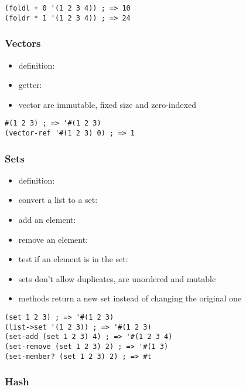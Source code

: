 \documentclass[a4paper,landscape,10pt]{article}
\begin{document}
\begin{multicols*}{2}
  \begin{lstlisting}[language=Racket]
(foldl + 0 '(1 2 3 4)) ; => 10
(foldr * 1 '(1 2 3 4)) ; => 24
  \end{lstlisting}

  \subsubsection{Vectors}

  \begin{itemize}
    \item definition: 
    \item getter: 
    \item vector are immutable, fixed size and zero-indexed
  \end{itemize}

  \begin{lstlisting}[language=Racket]
#(1 2 3) ; => '#(1 2 3)
(vector-ref '#(1 2 3) 0) ; => 1
  \end{lstlisting}

  \subsubsection{Sets}

  \begin{itemize}
    \item definition: 
    \item convert a list to a set: 
    \item add an element: 
    \item remove an element: 
    \item test if an element is in the set: 
    \item sets don't allow duplicates, are unordered and mutable
    \item methods return a new set instead of changing the original one
  \end{itemize}

  \begin{lstlisting}[language=Racket]
(set 1 2 3) ; => '#(1 2 3)
(list->set '(1 2 3)) ; => '#(1 2 3)
(set-add (set 1 2 3) 4) ; => '#(1 2 3 4)
(set-remove (set 1 2 3) 2) ; => '#(1 3)
(set-member? (set 1 2 3) 2) ; => #t
  \end{lstlisting}

  \breakcolumn

  \subsubsection{Hash}


\end{multicols*}
\end{document}
